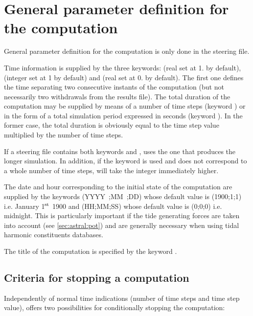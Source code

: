 \chapter{General parameter definition for the computation}
\label{ch:gen:par:def:comp}
General parameter definition for the computation is only done in the steering
file.

Time information is supplied by the three keywords:
 (real set at 1. by default), 
(integer set at 1 by default) and  (real set at 0. by default).
The first one defines the time separating two consecutive instants of the
computation (but not necessarily two withdrawals from the results file).
The total duration of the computation may be supplied by means
of a number of time steps (keyword )
or in the form of a total simulation period expressed in seconds
(keyword ).
In the former case, the total duration is obviously equal to the time step value
multiplied by the number of time steps.

If a steering file contains both keywords 
and ,  uses the one that produces
the longer simulation.
In addition, if the keyword  is used and does not correspond
to a whole number of time steps,  will take the integer immediately
higher.

The date and hour corresponding to the initial state of the computation
are supplied by the keywords  (YYYY~;MM~;DD)
whose default value is (1900;1;1) i.e. January 1$^{\rm{st}}$ 1900
and  (HH;MM;SS)
whose default value is (0;0;0) i.e. midnight.
This is particularly important if the tide generating forces are taken
into account (see \ref{sec:astral:pot}) and are generally necessary
when using tidal harmonic constituents databases.

The title of the computation is specified by the keyword .


\section{Criteria for stopping a computation}

Independently of normal time indications (number of time steps and time step
value),  offers two possibilities for conditionally stopping the
computation:

